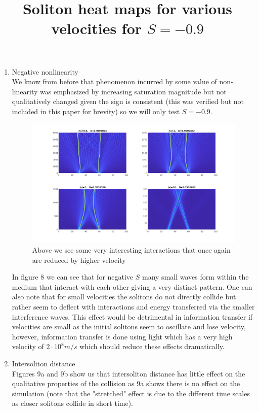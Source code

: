 \documentclass{article}
\begin{document}
\begin{enumerate}
\begin{flushleft}
\end{flushleft}
\pagebreak
\item Negative nonlinearity \\
We know from before that phenomenon incurred by some value of non-linearity was emphasized by increasing saturation magnitude but not qualitatively changed given the sign is consistent (this was verified but not included in this paper for brevity) so we will only test $S = -0.9$.

\begin{figure}[h!]
\title{Soliton heat maps for various velocities for $S=-0.9$\\}
\includegraphics[scale=0.42,center]{3D_V_Sneg09.jpg}
\caption{Above we see some very interesting interactions that once again are reduced by higher velocity}
\end{figure}
In figure 8 we can see that for negative $S$ many small waves form within the medium that interact with each other giving a very distinct pattern. One can also note that for small velocities the solitons do not directly collide but rather seem to deflect with interactions and energy transferred via the smaller interference waves. This effect would be detrimental in information transfer if velocities are small as the initial solitons seem to oscillate and lose velocity, however, information transfer is done using light which has a very high velocity of $2\cdot 10^{8} m/s$ which should reduce these effects dramatically. 
\item Intersoliton distance \\
Figures 9a and 9b show us that intersoliton distance has little effect on the qualitative properties of the collision as 9a shows there is no effect on the simulation (note that the "stretched" effect is due to the different time scales as closer solitons collide in short time).\par

\end{enumerate}
\end{document}
